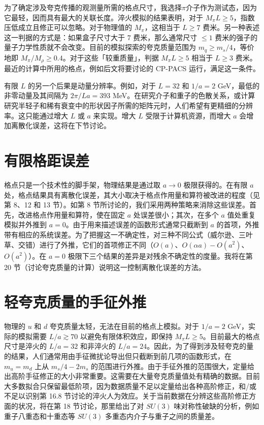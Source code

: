 为了确定涉及夸克传播的观测量所需的格点尺寸，我选择$\pi$介子作为测试态，因为它最轻，因而具有最大的关联长度。淬火模拟的结果表明，对于 $M_\pi L \ge 5$，指数压低成立且修正可以忽略。对于物理值的 $M_\pi$，这相当于 $L \ge 7$ 费米。另一种表述这一判据的方式是：如果盒子尺寸大于 $7$ 费米，那么通常尺寸 $\le 1$ 费米的强子的量子力学性质就不会改变。目前的模拟探索的夸克质量范围为 $m_q \ge m_s/4$，等价地即 $M_\pi / M_\rho \ge 0.4$。对于这些「较重质量」，判据 $M_\pi L \ge 5$ 相当于 $L \ge 3$ 费米。最近的计算中所用的格点，例如后文将要讨论的 CP-PACS 运行，满足这一条件。

有限 $L$ 的另一个后果是动量分辨率。例如，对于 $L = 32$ 和 $1/a = 2$ GeV，最低的非零动量及其间隔为 $2\pi/La = 393$ MeV。在研究介子和重子的色散关系，或计算研究半轻子和稀有衰变中的形状因子所需的矩阵元时，人们希望有更精细的分辨率。这只能通过增大 $L$ 或 $a$ 来实现。增大 $L$ 受限于计算机资源，而增大 $a$ 会增加离散化误差，这将在下节讨论。

\section{有限格距误差}

格点只是一个技术性的脚手架，物理结果是通过取 $a \to 0$ 极限获得的。在有限 $a$ 处，格点结果具有离散化误差，其大小取决于格点作用量和算符被改进的程度（见第 8、12 和 13 节）。如第 8 节所讨论的，我们采用两种策略来消除这些误差。首先，改进格点作用量和算符，使在固定 $a$ 处误差很小；其次，在多个 $a$ 值处重复模拟并外推到 $a = 0$。由于用来描述误差的函数形式通常只截断到 $a$ 的首项，外推带有相应的系统误差。为了把握这一不确定性，对三种不同公式（威尔逊、三叶草、交错）进行了外推，它们的首项修正不同（$O(a)$、$O(\alpha a) - O(a^2)$、$O(a^2)$）。在 $a = 0$ 极限下三个结果的差异是对残余不确定性的度量。我将在第 20 节（讨论夸克质量的计算）说明这一控制离散化误差的方法。

\section{轻夸克质量的手征外推}

物理的 $u$ 和 $d$ 夸克质量太轻，无法在目前的格点上模拟。对于 $1/a = 2$ GeV，实际的模拟需要 $L/a \gtrsim 70$ 以避免有限体积效应，即保持 $M_\pi L \ge 5$。目前最大的格点尺寸是淬火的 $L/a = 32$ 和非淬火的 $L/a = 24$。因此，为了得到涉及轻夸克的量的结果，人们通常用由手征微扰论导出但只截断到前几项的函数形式，在 $m_u = m_d$ 上从 $m_s/4 - 2m_s$ 的范围进行外推。由于手征外推的范围很大，定量给出高阶手征修正的大小非常重要。这需要在大量夸克质量值处有精确的数据。目前大多数拟合只保留最低阶项，因为数据质量不足以定量给出各种高阶修正，和/或不足以识别第 16.8 节讨论的淬火人为效应。关于当前数据在分辨这些高阶修正方面的状况，将在第 18 节讨论，那里给出了对 $SU(3)$ 味对称性破缺的分析，例如重子八重态和十重态等 $SU(3)$ 多重态内介子与重子之间的质量差。

